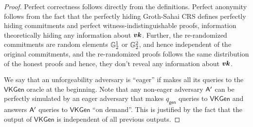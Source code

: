 \begin{proof}
Perfect correctness follows directly from the definitions. Perfect anonymity follows from the fact that the perfectly hiding Groth-Sahai CRS defines perfectly hiding commitments and perfect witness-indistinguishable proofs, information theoretically hiding any information about ${\boldsymbol{vk}}$. Further, the re-randomized commitments are random elements $\mathbb{G}_2^1$ or $\mathbb{G}_2^2$, and hence independent of the original commitments, and the re-randomized proofs follows the same distribution of the honest proofs and hence, they don't reveal any information about ${\boldsymbol{vk}}$.

We say that an unforgeability adversary is ``eager'' if  makes all its queries to the $\mathsf{VKGen}$ oracle at the beginning. Note that any non-eager adversary $\mathsf{A}'$ can be perfectly simulated  by an eager adversary that makes ${q_\mathsf{gen}}$ queries to $\mathsf{VKGen}$ and answers $\mathsf{A}'$ queries to $\mathsf{VKGen}$ ``on demand''. This is justified by the fact that the output of $\mathsf{VKGen}$ is independent of all previous outputs.


\end{proof}

